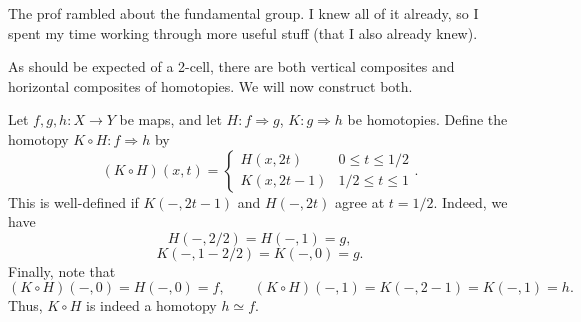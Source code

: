 
The prof rambled about the fundamental group. I knew all of it already, so I spent my time working through more useful stuff (that I also already knew).

As should be expected of a 2-cell, there are both vertical composites and horizontal composites of homotopies. We will now construct both.
\begin{construction}\label{const:1-1-6}
	Let $f,g,h : X \to Y$ be maps, and let $H : f \Rightarrow g$, $K : g \Rightarrow h$ be homotopies. Define the homotopy $K\circ H: f \Rightarrow h$ by
	\[
		(K\circ H)(x,t) = \begin{cases}
			H(x,2t) & 0\leq t\leq 1/2 \\
			K(x,2t-1) & 1/2 \leq t\leq 1
		\end{cases}
	.\]
	This is well-defined if $K(-,2t-1)$ and $H(-,2t)$ agree at $t=1/2$. Indeed, we have
	\[
		H(-,2/2) = H(-,1) = g,
	\]
	\[
		K(-,1-2/2) = K(-,0)=g
	.\]
	Finally, note that
	\[
		(K\circ H)(-,0) = H(-,0)=f,\qquad (K\circ H)(-,1) = K(-,2-1)=K(-,1)=h
	.\]
	Thus, $K\circ H$ is indeed a homotopy $h\simeq f$.
\end{construction}

